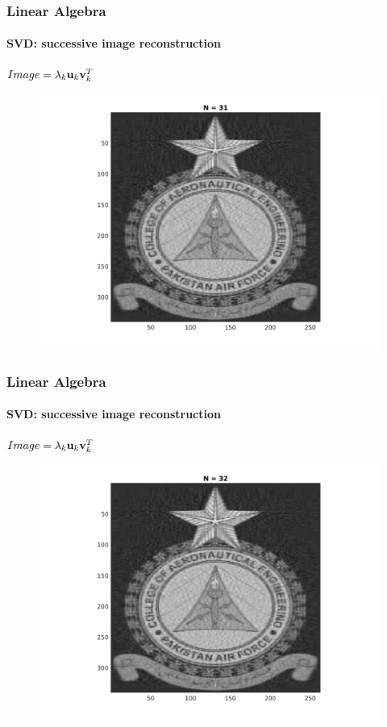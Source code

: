 \documentclass[hyperref={pdfpagelabels=true}]{beamer}
\begin{document}
\begin{frame}
\frametitle{Linear Algebra}
\framesubtitle{SVD: successive image reconstruction} 
\small{
\begin{center}
$Image = \lambda_k{\bf u}_k {\bf v}_k^T$
\end{center}}
\begin{figure}[!htb]
\centering
\includegraphics [scale=0.48]{n/b31.png}
\end{figure}
\end{frame}

\begin{frame}
\frametitle{Linear Algebra}
\framesubtitle{SVD: successive image reconstruction} 
\small{
\begin{center}
$Image = \lambda_k{\bf u}_k {\bf v}_k^T$
\end{center}}
\begin{figure}[!htb]
\centering
\includegraphics [scale=0.48]{n/b32.png}
\end{figure}
\end{frame}
\end{document}
